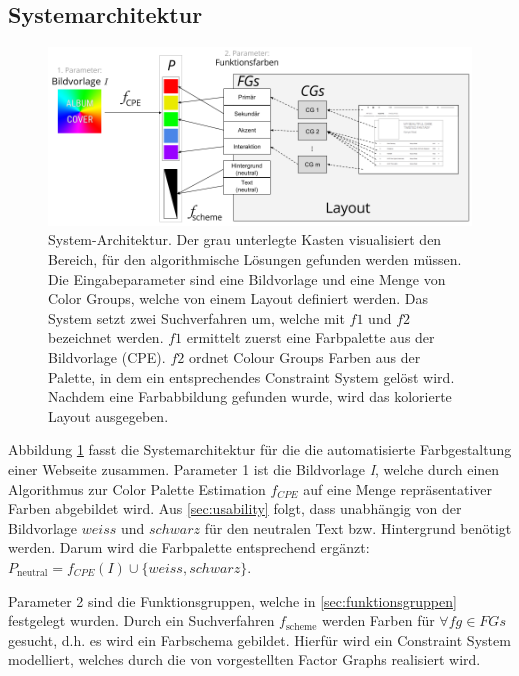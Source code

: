 \subsection{Systemarchitektur}
\label{sec:architektur}

\begin{figure}
	\centering
	\includegraphics[width=1\textwidth]{img/architecture.png}
	\caption{System-Architektur. Der grau unterlegte Kasten visualisiert den Bereich, für den algorithmische Lösungen gefunden werden müssen. Die Eingabeparameter sind eine Bildvorlage und eine Menge von Color Groups, welche von einem Layout definiert werden. Das System setzt zwei Suchverfahren um, welche mit $f1$ und $f2$ bezeichnet werden. $f1$ ermittelt zuerst eine Farbpalette aus der Bildvorlage (CPE). $f2$ ordnet Colour Groups Farben aus der Palette, in dem ein entsprechendes Constraint System gelöst wird. Nachdem eine Farbabbildung gefunden wurde, wird das kolorierte Layout ausgegeben.}
	\label{fig:architecture}
\end{figure}

Abbildung \ref{fig:architecture} fasst die Systemarchitektur für die die automatisierte Farbgestaltung einer Webseite zusammen. Parameter 1 ist die Bildvorlage \emph{I}, welche durch einen Algorithmus zur Color Palette Estimation $f_{CPE}$ auf eine Menge repräsentativer Farben abgebildet wird. Aus \autoref{sec:usability} folgt, dass unabhängig von der Bildvorlage $weiss$ und $schwarz$ für den neutralen Text bzw. Hintergrund benötigt werden. Darum wird die Farbpalette entsprechend ergänzt: $P_\text{neutral} = f_{CPE}(I) \cup \{weiss, schwarz\}$.

Parameter 2 sind die Funktionsgruppen, welche in \autoref{sec:funktionsgruppen} festgelegt wurden. Durch ein Suchverfahren $f_\text{scheme}$ werden Farben für $\forall fg \in FGs$ gesucht, d.h. es wird ein Farbschema gebildet. Hierfür wird ein Constraint System modelliert, welches durch die von \citet{patterns} vorgestellten Factor Graphs realisiert wird.

